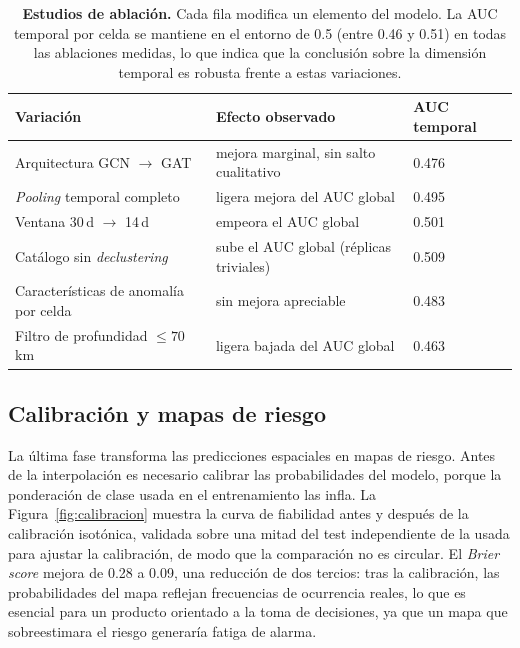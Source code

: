 \begin{table}[ht!]
  \centering
  \small
  \begin{tabular}{@{}lll@{}}
    \toprule
    \textbf{Variación}                    & \textbf{Efecto observado}               & \textbf{AUC temporal} \\
    \midrule
    Arquitectura GCN \(\to\) GAT          & mejora marginal, sin salto cualitativo  & 0.476                 \\
    \textit{Pooling} temporal completo    & ligera mejora del AUC global            & 0.495                 \\
    Ventana 30\,d \(\to\) 14\,d           & empeora el AUC global                   & 0.501                 \\
    Catálogo sin \textit{declustering}    & sube el AUC global (réplicas triviales) & 0.509                 \\
    Características de anomalía por celda & sin mejora apreciable                   & 0.483                 \\
    Filtro de profundidad \(\leq 70\)\,km & ligera bajada del AUC global            & 0.463                 \\
    \bottomrule
  \end{tabular}
  \caption[Resumen de los estudios de ablación]{\textbf{Estudios de ablación.} Cada fila modifica un elemento del modelo. La AUC temporal por celda se mantiene en el entorno de 0.5 (entre 0.46 y 0.51) en todas las ablaciones medidas, lo que indica que la conclusión sobre la dimensión temporal es robusta frente a estas variaciones.}
  \label{tab:ablations}
\end{table}

\subsection{Calibración y mapas de riesgo}
\label{res-gp}

La última fase transforma las predicciones espaciales en mapas de riesgo. Antes de la
interpolación es necesario calibrar las probabilidades del modelo, porque la ponderación de clase
usada en el entrenamiento las infla. La Figura~\ref{fig:calibracion} muestra la curva de
fiabilidad antes y después de la calibración isotónica, validada sobre una mitad del test
independiente de la usada para ajustar la calibración, de modo que la comparación no es
circular. El \textit{Brier score} mejora de 0.28 a 0.09, una reducción de dos tercios: tras
la calibración, las probabilidades del mapa reflejan frecuencias de ocurrencia reales, lo que es
esencial para un producto orientado a la toma de decisiones, ya que un mapa que sobreestimara el
riesgo generaría fatiga de alarma.

